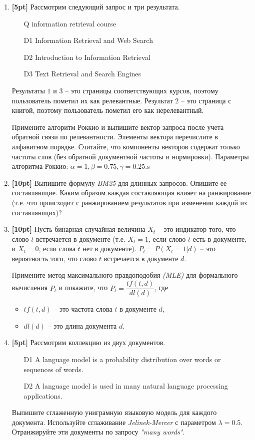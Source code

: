\begin{enumerate}
	\item \textbf{[5pt]} Рассмотрим следующий запрос и три результата.
	\begin{enumerate}
		\item[Q] information retrieval course
		\item[D1] Information Retrieval and Web Search
		\item[D2] Introduction to Information Retrieval
		\item[D3] Text Retrieval and Search Engines
	\end{enumerate}
	
	Результаты $1$ и $3$ – это страницы соответствующих курсов, поэтому пользователь пометил их 
	как релевантные. Результат $2$ – это страница с книгой, поэтому пользователь пометил его как 
	нерелевантный.
	
	Примените алгоритм Роккио и выпишите вектор запроса после учета обратной связи по 
	релевантности. Элементы вектора перечислите в алфавитном порядке. Считайте, что компоненты 
	векторов содержат только частоты слов (без обратной документной частоты и нормировки). 
	Параметры алгоритма Роккио: $\alpha = 1, \beta = 0.75, \gamma = 0.25.$s

	\item \textbf{[10pt]} Выпишите формулу \textit{BM25} для длинных запросов. Опишите ее 
	составляющие. Каким образом каждая составляющая влияет на ранжирование (т.е. что происходит	с 
	ранжированием результатов при изменении каждой из составляющих)?

	\item \textbf{[10pt]} Пусть бинарная случайная величина $X_t$ – это индикатор того, что слово 
	$t$	встречается в документе (т.е. $X_t = 1$, если слово $t$ есть в документе, и $X_t = 0$, 
	если слова $t$ нет в документе). $P_t = P(X_t = 1 \big| d)$ – это вероятность того, что слово 
	$t$ встречается в документе $d$. 
	
	Примените метод максимального правдоподобия \textit{(MLE)} для формального вычисления $P_t$ и 
	покажите, что $P_t = \dfrac{tf(t,d)} {dl(d)}$, где 
	\begin{itemize}
		\item $tf(t, d)$ – это частота слова $t$ в документе $d$, 
		\item $dl(d)$ – это длина документа $d$.
	\end{itemize}
	
	\item \textbf{[5pt]} Рассмотрим коллекцию из двух документов.
	\begin{enumerate}
		\item[D1] A language model is a probability distribution over words or sequences of words.
		\item[D2] A language model is used in many natural language processing applications.
	\end{enumerate}

	Выпишите сглаженную униграмную языковую модель для каждого документа. Используйте сглаживание 
	\textit{Jelinek-Mercer} с параметром $\lambda = 0.5$. Отранжируйте эти документы по запросу 
	\textit{"many words"}.
\end{enumerate}
